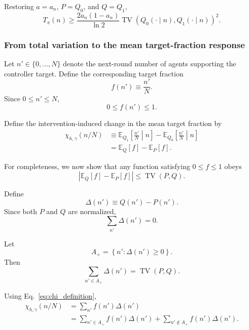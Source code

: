 Restoring \(a=a_n\), \(P=Q_0\), and \(Q=Q_1\),
\begin{equation}
T_\pi(n)
\ge
\frac{2a_n(1-a_n)}{\ln 2}
\operatorname{TV}
\left(
Q_0(\cdot\mid n),
Q_1(\cdot\mid n)
\right)^2.
\label{eq:js_tv_original}
\end{equation}

\subsubsection{From total variation to the mean target-fraction response}

Let \(n'\in\{0,\ldots,N\}\) denote the next-round number of agents
supporting the controller target. Define the corresponding target
fraction
\begin{equation}
f(n')
\equiv
\frac{n'}{N}.
\label{eq:f_definition}
\end{equation}
Since \(0\le n'\le N\),
\begin{equation}
0\le f(n')\le 1.
\label{eq:f_bounded}
\end{equation}

Define the intervention-induced change in the mean target fraction by
\begin{align}
\chi_{h,\gamma}(n/N)
&\equiv
\mathbb{E}_{Q_1}
\left[
\frac{n'}{N}
\middle| n
\right]
-
\mathbb{E}_{Q_0}
\left[
\frac{n'}{N}
\middle| n
\right]
\nonumber\\
&=
\mathbb{E}_{Q}[f]
-
\mathbb{E}_{P}[f].
\label{eq:chi_definition}
\end{align}

For completeness, we now show that any function satisfying
\(0\le f\le1\) obeys
\begin{equation}
\left|
\mathbb{E}_{Q}[f]
-
\mathbb{E}_{P}[f]
\right|
\le
\operatorname{TV}(P,Q).
\label{eq:bounded_expectation_tv}
\end{equation}

Define
\[
\Delta(n')\equiv Q(n')-P(n').
\]
Since both \(P\) and \(Q\) are normalized,
\begin{equation}
\sum_{n'}\Delta(n')=0.
\end{equation}

Let
\[
A_+
=
\left\{
n':\Delta(n')\ge0
\right\}.
\]
Then
\begin{equation}
\sum_{n'\in A_+}\Delta(n')
=
\operatorname{TV}(P,Q).
\label{eq:positive_tv}
\end{equation}

Using Eq.~\eqref{eq:chi_definition},
\begin{align}
\chi_{h,\gamma}(n/N)
&=
\sum_{n'}
f(n')\Delta(n')
\nonumber\\
&=
\sum_{n'\in A_+}
f(n')\Delta(n')
+
\sum_{n'\notin A_+}
f(n')\Delta(n').
\end{align}

